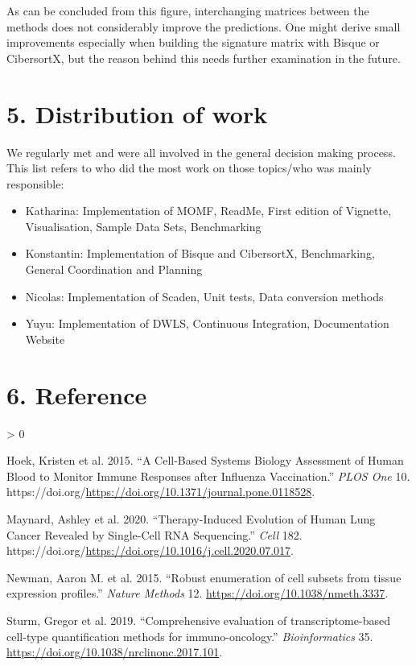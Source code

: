 \documentclass[
]{article}
\providecommand{\tightlist}{%
  \setlength{\itemsep}{0pt}\setlength{\parskip}{0pt}}
\newlength{\cslhangindent}
\newenvironment{CSLReferences}[2] %
 {%
  \setlength{\parindent}{0pt}
  \ifodd #1 \everypar{\setlength{\hangindent}{\cslhangindent}}\ignorespaces\fi
  \ifnum #2 > 0
  \setlength{\parskip}{#2\baselineskip}
  \fi
 }%
 {}
\begin{document}
As can be concluded from this figure, interchanging matrices between the
methods does not considerably improve the predictions. One might derive
small improvements especially when building the signature matrix with
Bisque or CibersortX, but the reason behind this needs further
examination in the future.

\hypertarget{distribution-of-work}{%
\section{5. Distribution of work}\label{distribution-of-work}}

We regularly met and were all involved in the general decision making
process. This list refers to who did the most work on those topics/who
was mainly responsible:

\begin{itemize}
\tightlist
\item
  Katharina: Implementation of MOMF, ReadMe, First edition of Vignette,
  Visualisation, Sample Data Sets, Benchmarking
\item
  Konstantin: Implementation of Bisque and CibersortX, Benchmarking,
  General Coordination and Planning
\item
  Nicolas: Implementation of Scaden, Unit tests, Data conversion methods
\item
  Yuyu: Implementation of DWLS, Continuous Integration, Documentation
  Website
\end{itemize}

\hypertarget{reference}{%
\section*{6. Reference}\label{reference}}

\hypertarget{refs}{}
\begin{CSLReferences}{1}{0}
\leavevmode\hypertarget{ref-Hoek2015}{}%
Hoek, Kristen et al. 2015. {``{A Cell-Based Systems Biology Assessment
of Human Blood to Monitor Immune Responses after Influenza
Vaccination}.''} \emph{PLOS One} 10.
https://doi.org/\url{https://doi.org/10.1371/journal.pone.0118528}.

\leavevmode\hypertarget{ref-Maynard2020}{}%
Maynard, Ashley et al. 2020. {``{Therapy-Induced Evolution of Human Lung
Cancer Revealed by Single-Cell RNA Sequencing}.''} \emph{Cell} 182.
https://doi.org/\url{https://doi.org/10.1016/j.cell.2020.07.017}.

\leavevmode\hypertarget{ref-Newman2015}{}%
Newman, Aaron M. et al. 2015. {``{Robust enumeration of cell subsets
from tissue expression profiles}.''} \emph{Nature Methods} 12.
\url{https://doi.org/10.1038/nmeth.3337}.

\leavevmode\hypertarget{ref-Sturm2019}{}%
Sturm, Gregor et al. 2019. {``{Comprehensive evaluation of
transcriptome-based cell-type quantification methods for
immuno-oncology}.''} \emph{Bioinformatics} 35.
\url{https://doi.org/10.1038/nrclinonc.2017.101}.

\end{CSLReferences}
\end{document}
